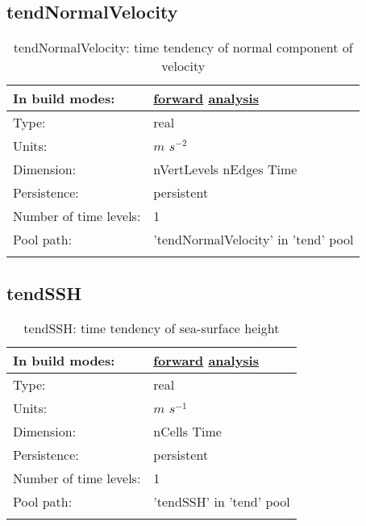 \subsection[tendNormalVelocity]{tendNormalVelocity}
\label{subsec:var_sec_tend_tendNormalVelocity}
\begin{center}
\begin{longtable}{| p{2.0in} | p{4.0in} |}
        \hline 
        In build modes: & \hyperref[subsec:forward_var_tab_tend]{forward} \hyperref[subsec:analysis_var_tab_tend]{analysis} \\
        \hline 
        Type: & real \\
        \hline 
        Units: & $m$ $s^{-2}$ \\
        \hline 
        Dimension: & nVertLevels nEdges Time \\
        \hline 
        Persistence: & persistent \\
        \hline 
        Number of time levels: & 1 \\
        \hline 
            Pool path: & 'tendNormalVelocity' in 'tend' pool
 \\
		 \hline 
    \caption{tendNormalVelocity: time tendency of normal component of velocity}
\end{longtable}
\end{center}
\subsection[tendSSH]{tendSSH}
\label{subsec:var_sec_tend_tendSSH}
\begin{center}
\begin{longtable}{| p{2.0in} | p{4.0in} |}
        \hline 
        In build modes: & \hyperref[subsec:forward_var_tab_tend]{forward} \hyperref[subsec:analysis_var_tab_tend]{analysis} \\
        \hline 
        Type: & real \\
        \hline 
        Units: & $m$ $s^{-1}$ \\
        \hline 
        Dimension: & nCells Time \\
        \hline 
        Persistence: & persistent \\
        \hline 
        Number of time levels: & 1 \\
        \hline 
            Pool path: & 'tendSSH' in 'tend' pool
 \\
		 \hline 
    \caption{tendSSH: time tendency of sea-surface height}
\end{longtable}
\end{center}
